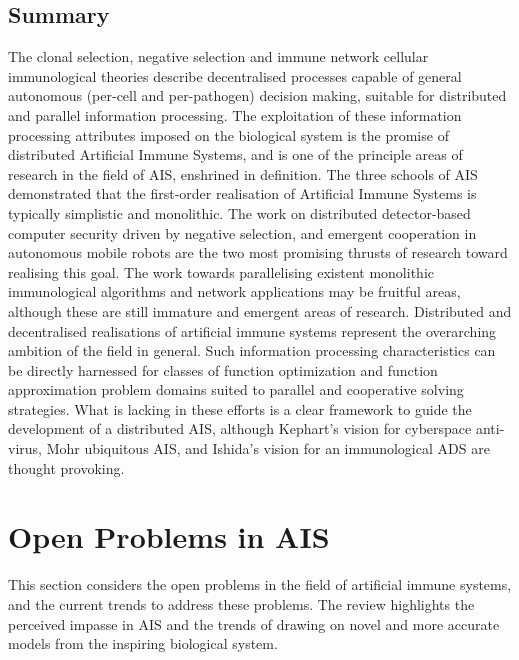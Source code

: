 \subsection{Summary}
\label{subsec:background:distributed:summary}
The clonal selection, negative selection and immune network cellular immunological theories describe decentralised processes capable of general autonomous (per-cell and per-pathogen) decision making, suitable for distributed and parallel information processing. The exploitation of these information processing attributes imposed on the biological system is the promise of distributed Artificial Immune Systems, and is one of the principle areas of research in the field of AIS, enshrined in definition. The three schools of AIS demonstrated that the first-order realisation of Artificial Immune Systems is typically simplistic and monolithic. The work on distributed detector-based computer security driven by negative selection, and emergent cooperation in autonomous mobile robots are the two most promising thrusts of research toward realising this goal. The work towards parallelising existent monolithic immunological algorithms and network applications may be fruitful areas, although these are still immature and emergent areas of research. 
Distributed and decentralised realisations of artificial immune systems represent the overarching ambition of the field in general. Such information processing characteristics can be directly harnessed for classes of function optimization and function approximation problem domains suited to parallel and cooperative	 solving strategies.
What is lacking in these efforts is a clear framework to guide the development of a distributed AIS, although Kephart's vision for cyberspace anti-virus, Mohr ubiquitous AIS, and Ishida's vision for an immunological ADS are thought provoking. 


%
%
\section{Open Problems in AIS}
\label{sec:background:openproblems}
This section considers the open problems in the field of artificial immune systems, and the current trends to address these problems. The review highlights the perceived impasse in AIS and the trends of drawing on novel and more accurate models from the inspiring biological system.

